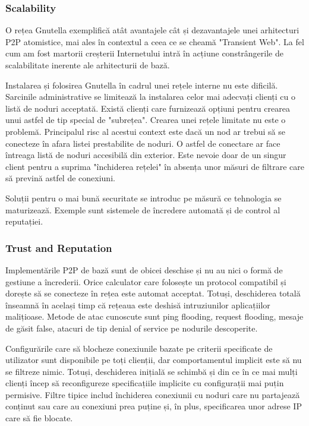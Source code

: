\subsubsection{Scalability}

O rețea Gnutella exemplifică atât avantajele cât și dezavantajele unei
arhitecturi P2P atomistice, mai ales în contextul a ceea ce se cheamă
"Transient Web". La fel cum am fost martorii creșterii Internetului intră în
acțiune constrângerile de scalabilitate inerente ale arhitecturii de bază.

Instalarea și folosirea Gnutella în cadrul unei rețele interne nu este
dificilă. Sarcinile administrative se limitează la instalarea celor mai
adecvați clienți cu o listă de noduri acceptată. Există clienți care
furnizează opțiuni pentru crearea unui astfel de tip special de "subrețea".
Crearea unei rețele limitate nu este o problemă. Principalul risc al acestui
context este dacă un nod ar trebui să se conecteze în afara listei
prestabilite de noduri. O astfel de conectare ar face întreaga listă de noduri
accesibilă din exterior. Este nevoie doar de un singur client pentru a suprima
"închiderea rețelei" în absența unor măsuri de filtrare care să prevină astfel
de conexiuni.

Soluții pentru o mai bună securitate se introduc pe măsură ce tehnologia se
maturizează. Exemple sunt sistemele de încredere automată și de control al
reputației.

\subsubsection{Trust and Reputation}

Implementările P2P de bază sunt de obicei deschise și nu au nici o formă de
gestiune a încrederii. Orice calculator care folosește un protocol compatibil
și dorește să se conecteze în rețea este automat acceptat. Totuși, deschiderea
totală înseamnă în același timp că rețeaua este deshisă intruziunilor
aplicațiilor malițioase. Metode de atac cunoscute sunt ping flooding, request
flooding, mesaje de găsit false, atacuri de tip denial of service pe nodurile
descoperite.

Configurările care să blocheze conexiunile bazate pe criterii specificate de
utilizator sunt disponibile pe toți clienții, dar comportamentul implicit este
să nu se filtreze nimic. Totuși, deschiderea inițială se schimbă și din ce în
ce mai mulți clienți încep să reconfigureze specificațiile implicite cu
configurații mai puțin permisive. Filtre tipice includ închiderea conexiunii
cu noduri care nu partajează conținut sau care au conexiuni prea puține și, în
plus, specificarea unor adrese IP care să fie blocate.

